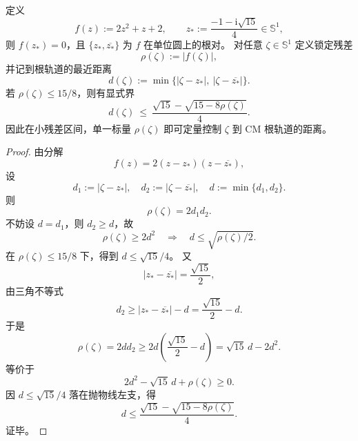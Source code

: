 \begin{proposition}[CM 相位锁定的单标量可逆压缩]\label{prop:xi-cm-phase-lock-single-scalar-recoverability}
定义
\[
f(z):=2z^2+z+2,\qquad
z_\ast:=\frac{-1-\mathrm{i}\sqrt{15}}{4}\in\mathbb S^1,
\]
则 \(f(z_\ast)=0\)，且 \(\{z_\ast,\overline{z_\ast}\}\) 为 \(f\) 在单位圆上的根对。
对任意 \(\zeta\in\mathbb S^1\) 定义锁定残差
\[
\rho(\zeta):=|f(\zeta)|,
\]
并记到根轨道的最近距离
\[
d(\zeta):=\min\{|\zeta-z_\ast|,\ |\zeta-\overline{z_\ast}|\}.
\]
若 \(\rho(\zeta)\le 15/8\)，则有显式界
\[
d(\zeta)\ \le\
\frac{\sqrt{15}-\sqrt{15-8\rho(\zeta)}}{4}.
\]
因此在小残差区间，单一标量 \(\rho(\zeta)\) 即可定量控制 \(\zeta\) 到 CM 根轨道的距离。
\end{proposition}
\begin{proof}
由分解
\[
f(z)=2(z-z_\ast)(z-\overline{z_\ast}),
\]
设
\[
d_1:=|\zeta-z_\ast|,\quad d_2:=|\zeta-\overline{z_\ast}|,\quad d:=\min\{d_1,d_2\}.
\]
则
\[
\rho(\zeta)=2d_1d_2.
\]
不妨设 \(d=d_1\)，则 \(d_2\ge d\)，故
\[
\rho(\zeta)\ge 2d^2\quad\Rightarrow\quad d\le \sqrt{\rho(\zeta)/2}.
\]
在 \(\rho(\zeta)\le 15/8\) 下，得到 \(d\le \sqrt{15}/4\)。
又
\[
|z_\ast-\overline{z_\ast}|=\frac{\sqrt{15}}{2},
\]
由三角不等式
\[
d_2\ge |z_\ast-\overline{z_\ast}|-d=\frac{\sqrt{15}}{2}-d.
\]
于是
\[
\rho(\zeta)=2dd_2
\ge 2d\left(\frac{\sqrt{15}}{2}-d\right)
=\sqrt{15}\,d-2d^2.
\]
等价于
\[
2d^2-\sqrt{15}\,d+\rho(\zeta)\ge 0.
\]
因 \(d\le\sqrt{15}/4\) 落在抛物线左支，得
\[
d\le
\frac{\sqrt{15}-\sqrt{15-8\rho(\zeta)}}{4}.
\]
证毕。
\end{proof}



\endinput
